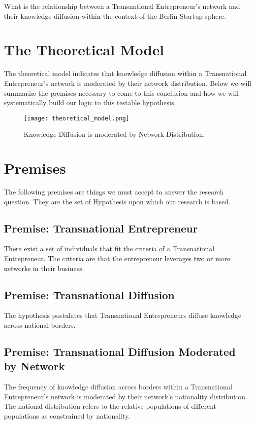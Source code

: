 What is the relationship between a Transnational Entrepreneur's network and their knowledge diffusion within the context of the Berlin Startup sphere.

\section{The Theoretical Model}
The theoretical model indicates that knowledge diffusion within a Transnational Entrepreneur's network is moderated by their network distribution. Below we will summarize the premises necessary to come to this conclusion and how we will systematically build our logic to this testable hypothesis.
\begin{figure}[!ht]
  \centering
  \texttt{[image: theoretical\_model.png]}
  \caption{Knowledge Diffusion is moderated by Network Distribution.}
\end{figure}

\section{Premises}
The following premises are things we must accept to answer the research question. They are the set of Hypothesis upon which our research is based.
\subsection{Premise: Transnational Entrepreneur}
There exist a set of individuals that fit the criteria of a Transnational Entrepreneur. The criteria are that the entrepreneur leverages two or more networks in their business. 
\subsection{Premise: Transnational Diffusion}
The hypothesis postulates that Transnational Entrepreneurs diffuse knowledge across national borders.
\subsection{Premise: Transnational Diffusion Moderated by Network}
The frequency of knowledge diffusion across borders within a Transnational Entrepreneur's network is moderated by their network's nationality distribution. The national distribution refers to the relative populations of different populations as constrained by nationality.
